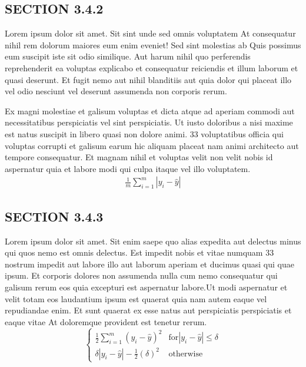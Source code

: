 \documentclass[a4paper,12pt]{report}
\begin{document}
\subsection{SECTION 3.4.2}

\hspace{.5cm} Lorem ipsum dolor sit amet. Sit sint unde sed omnis voluptatem At consequatur nihil rem dolorum maiores eum enim eveniet! Sed sint molestias ab Quis possimus eum suscipit iste sit odio similique. Aut harum nihil quo perferendis reprehenderit ea voluptas explicabo et consequatur reiciendis et illum laborum et quasi deserunt. Et fugit nemo aut nihil blanditiis aut quia dolor qui placeat illo vel odio nesciunt vel deserunt assumenda non corporis rerum. 
\par Ex magni molestiae et galisum voluptas et dicta atque ad aperiam commodi aut necessitatibus perspiciatis vel sint perspiciatis. Ut iusto doloribus a nisi maxime est natus suscipit in libero quasi non dolore animi. 33 voluptatibus officia qui voluptas corrupti et galisum earum hic aliquam placeat nam animi architecto aut tempore consequatur. Et magnam nihil et voluptas velit non velit nobis id aspernatur quia et labore modi qui culpa itaque vel illo voluptatem. 
\begin{equation}
\begin{split}
\frac{1}{m} \sum_{i=1}^{m} |y_i-\hat{y}|
 \end{split}
\end{equation}

\subsection{SECTION 3.4.3}


\hspace{.5cm} Lorem ipsum dolor sit amet. Sit enim saepe quo alias expedita aut delectus minus qui quos nemo est omnis delectus. Est impedit nobis et vitae numquam 33 nostrum impedit aut labore illo aut laborum aperiam et ducimus quasi qui quae ipsum. Et corporis dolores non assumenda nulla cum nemo consequatur qui galisum rerum eos quia excepturi est aspernatur labore.Ut modi aspernatur et velit totam eos laudantium ipsum est quaerat quia nam autem eaque vel repudiandae enim. Et sunt quaerat ex esse natus aut perspiciatis perspiciatis et eaque vitae At doloremque provident est tenetur rerum. 
\begin{equation}
\begin{cases}
    \frac{1}{2} \sum_{i=1}^{m}(y_i-\hat{y})^2 & \text{for}|y_i-\hat{y}|\leq \delta \\
    \delta|y_i-\hat{y}|-\frac{1}{2}(\delta)^2 & \text{otherwise}
\end{cases}
    \end{equation}
\end{document}
